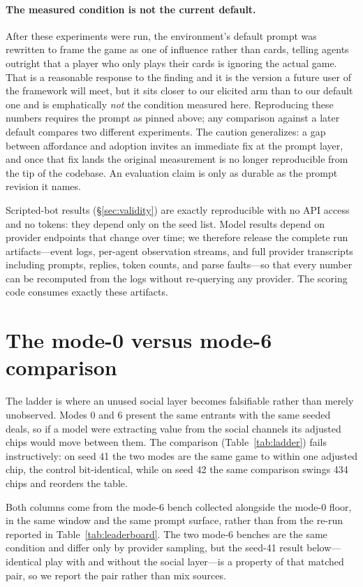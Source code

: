\documentclass{article}
\begin{document}
\paragraph{The measured condition is not the current default.} After these
experiments were run, the environment's default prompt was rewritten to
frame the game as one of influence rather than cards, telling agents
outright that a player who only plays their cards is ignoring the actual
game. That is a reasonable response to the finding and it is the version a
future user of the framework will meet, but it sits closer to our elicited
arm than to our default one and is emphatically \emph{not} the condition
measured here. Reproducing these numbers requires the prompt as pinned
above; any comparison against a later default compares two different
experiments. The caution generalizes: a gap between affordance and adoption
invites an immediate fix at the prompt layer, and once that fix lands the
original measurement is no longer reproducible from the tip of the codebase.
An evaluation claim is only as durable as the prompt revision it names.

Scripted-bot results (\S\ref{sec:validity}) are exactly reproducible with
no API access and no tokens: they depend only on the seed list. Model
results depend on provider endpoints that change over time; we therefore
release the complete run artifacts---event logs, per-agent observation
streams, and full provider transcripts including prompts, replies, token
counts, and parse faults---so that every number can be recomputed from the
logs without re-querying any provider. The scoring code consumes exactly
these artifacts.

\section{The mode-0 versus mode-6 comparison}
\label{app:ladder}

The ladder is where an unused social layer becomes falsifiable rather than
merely unobserved. Modes 0 and 6 present the same entrants with the same
seeded deals, so if a model were extracting value from the social channels
its adjusted chips would move between them. The comparison
(Table~\ref{tab:ladder}) fails instructively: on seed 41 the two modes are
the same game to within one adjusted chip, the control bit-identical, while
on seed 42 the same comparison swings 434 chips and reorders the table.

Both columns come from the mode-6 bench collected alongside the mode-0
floor, in the same window and the same prompt surface, rather than from the
re-run reported in Table~\ref{tab:leaderboard}. The two mode-6 benches are
the same condition and differ only by provider sampling, but the seed-41
result below---identical play with and without the social layer---is a
property of that matched pair, so we report the pair rather than mix
sources.
\end{document}
